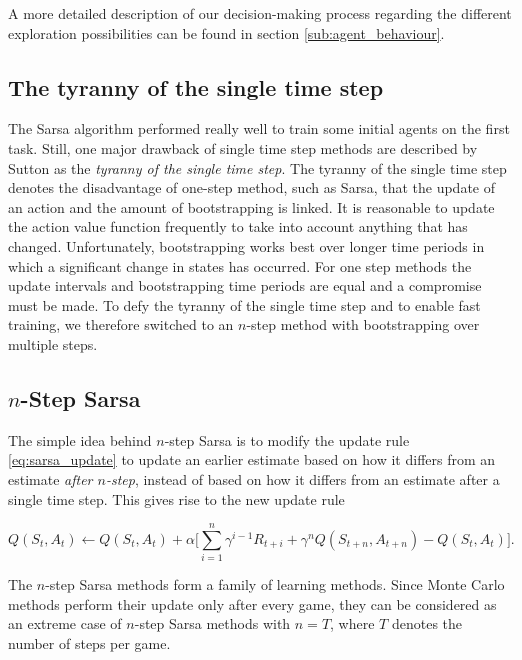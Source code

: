 A more detailed description of our decision-making process regarding the different exploration possibilities can be found in section \ref{sub:agent_behaviour}.

\subsection{The tyranny of the single time step}

The Sarsa algorithm performed really well to train some initial agents on the first task. Still, one major drawback of single time step methods are described by Sutton as the \emph{tyranny of the single time step}. The tyranny of the single time step denotes the disadvantage of one-step method, such as Sarsa, that the update of an action and the amount of bootstrapping is linked. It is reasonable to update the action value function frequently to take into account anything that has changed. Unfortunately, bootstrapping works best  over longer time periods in which a significant change in states has occurred. For one step methods the update intervals and bootstrapping time periods are equal and a compromise must be made. To defy the tyranny of the single time step and to enable fast training, we therefore switched to an $n$-step method with bootstrapping over multiple steps.

\subsection{$n$-Step Sarsa}

The simple idea behind $n$-step Sarsa is to modify the update rule \eqref{eq:sarsa_update} to update an earlier estimate based on how it differs from an  estimate \emph{after $n$-step}, instead of based on how it differs from an estimate after a single time step. This gives rise to the new update rule

\begin{equation} \label{eq:n_step_sarsa_update}
	Q(S_t, A_t) \leftarrow Q(S_t, A_t) + \alpha \big[\sum_{i=1}^n \gamma^{i-1}R_{t+i} + \gamma^n Q(S_{t+n}, A_{t+n}) - Q(S_t, A_t)\big].
\end{equation}

The $n$-step Sarsa methods form a family of learning methods. Since Monte Carlo methods perform their update only after every game, they can be considered as an extreme case of $n$-step Sarsa methods with $n = T$, where $T$ denotes the number of steps per game. 

